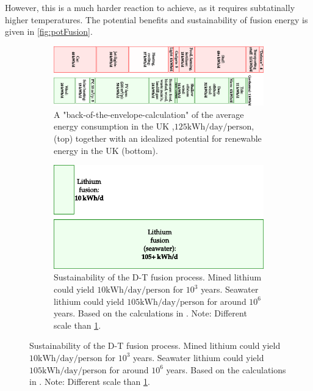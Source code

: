 However, this is a much harder reaction to achieve, as it requires subtatinally higher temperatures.
The potential benefits and sustainability of fusion energy is given in \cref{fig:potFusion}.
%
\begin{figure}[htbp]
    \centering
    \begin{subfigure}[h]{1.00\textwidth}
        \centering
        \includegraphics[width=1.0\textwidth]{fig/intro/energyConsumption}
        \caption{A "back-of-the-envelope-calculation" of the average energy consumption in the UK ,$125 \text{kWh/day/person}$, (top) together with an idealized potential for renewable energy in the UK (bottom).}
    \label{fig:energyConsumption}
    \end{subfigure}%
    \vfill
    \begin{subfigure}[h]{1.00\textwidth}
        \centering
        \includegraphics{fig/intro/lithium}
        \caption{
        Sustainability of the D-T fusion process.
        Mined lithium could yield $10 \text{kWh/day/person}$ for $10^{3}$ years.
        Seawater lithium could yield $105 \text{kWh/day/person}$ for around $10^{6}$ years.
        Based on the calculations in \cite{ongena2012,Eckhartt1995}.
        Note: Different scale than \cref{fig:energyConsumption}.
        }


\end{subfigure}
\end{figure}

